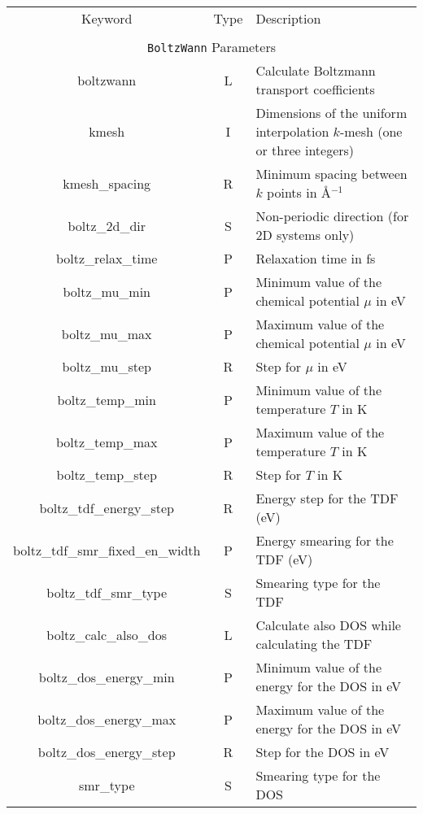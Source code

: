 \begin{table}[hH!]
\begin{center}
\begin{tabular}{|c|c|p{6cm}|}
\hline
Keyword & Type & Description \\
        &      &             \\
\hline\hline
\multicolumn{3}{|c|}{{\tt BoltzWann} Parameters} \\
\hline
{\sc boltzwann}   & L & Calculate Boltzmann transport coefficients \\
{\sc [boltz\_]kmesh} & I & Dimensions of the uniform interpolation 
$k$-mesh (one or three integers)\\ 
{\sc [boltz\_]kmesh\_spacing} & R & Minimum spacing between $k$ points in \AA$^{-1}$\\
{\sc boltz\_2d\_dir} & S & Non-periodic direction (for 2D systems only)\\
{\sc boltz\_relax\_time} & P & Relaxation time in fs\\
{\sc boltz\_mu\_min} & P & Minimum value of the chemical potential $\mu$ in eV\\
{\sc boltz\_mu\_max} & P & Maximum value of the chemical potential $\mu$ in eV\\
{\sc boltz\_mu\_step} & R & Step for $\mu$ in eV\\
{\sc boltz\_temp\_min} & P & Minimum value of the temperature $T$ in K \\
{\sc boltz\_temp\_max} & P & Maximum value of the temperature $T$ in K \\
{\sc boltz\_temp\_step} & R & Step for $T$ in K \\
{\sc boltz\_tdf\_energy\_step} & R & Energy step for the TDF (eV) \\
{\sc boltz\_tdf\_smr\_fixed\_en\_width} & P & Energy smearing for the TDF (eV) \\
{\sc boltz\_tdf\_smr\_type} & S & Smearing type for the TDF \\
{\sc boltz\_calc\_also\_dos} & L & Calculate also DOS while calculating the TDF\\
{\sc boltz\_dos\_energy\_min} & P & Minimum value of the energy for the DOS in eV \\
{\sc boltz\_dos\_energy\_max} & P & Maximum value of the energy for the DOS in eV \\
{\sc boltz\_dos\_energy\_step} & R & Step for the DOS in eV\\
{smr\_type} & S & Smearing type for the DOS \\

\end{tabular}
\end{center}
\end{table}
